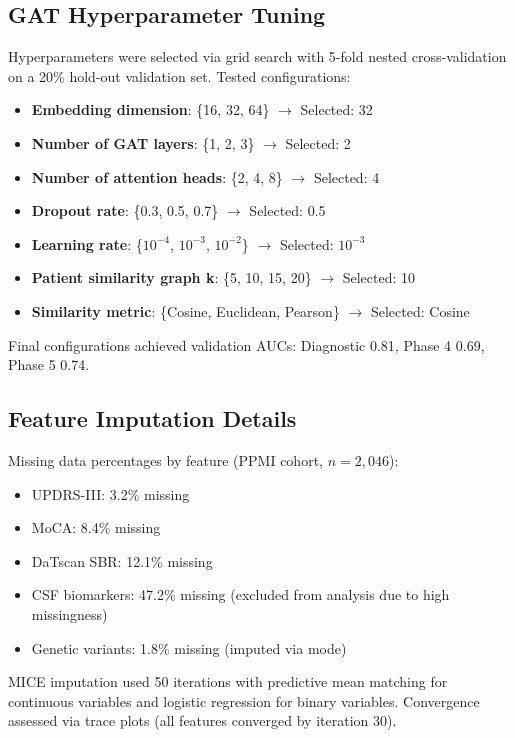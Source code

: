 \documentclass[11pt]{article}
\begin{document}
\subsection{GAT Hyperparameter Tuning}

Hyperparameters were selected via grid search with 5-fold nested cross-validation on a 20\% hold-out validation set. Tested configurations:

\begin{itemize}
\item \textbf{Embedding dimension}: \{16, 32, 64\} $\to$ Selected: 32
\item \textbf{Number of GAT layers}: \{1, 2, 3\} $\to$ Selected: 2
\item \textbf{Number of attention heads}: \{2, 4, 8\} $\to$ Selected: 4
\item \textbf{Dropout rate}: \{0.3, 0.5, 0.7\} $\to$ Selected: 0.5
\item \textbf{Learning rate}: \{$10^{-4}$, $10^{-3}$, $10^{-2}$\} $\to$ Selected: $10^{-3}$
\item \textbf{Patient similarity graph k}: \{5, 10, 15, 20\} $\to$ Selected: 10
\item \textbf{Similarity metric}: \{Cosine, Euclidean, Pearson\} $\to$ Selected: Cosine
\end{itemize}

Final configurations achieved validation AUCs: Diagnostic 0.81, Phase 4 0.69, Phase 5 0.74.

\subsection{Feature Imputation Details}

Missing data percentages by feature (PPMI cohort, $n=2,046$):
\begin{itemize}
\item UPDRS-III: 3.2\% missing
\item MoCA: 8.4\% missing
\item DaTscan SBR: 12.1\% missing
\item CSF biomarkers: 47.2\% missing (excluded from analysis due to high missingness)
\item Genetic variants: 1.8\% missing (imputed via mode)
\end{itemize}

MICE imputation used 50 iterations with predictive mean matching for continuous variables and logistic regression for binary variables. Convergence assessed via trace plots (all features converged by iteration 30).
\end{document}
